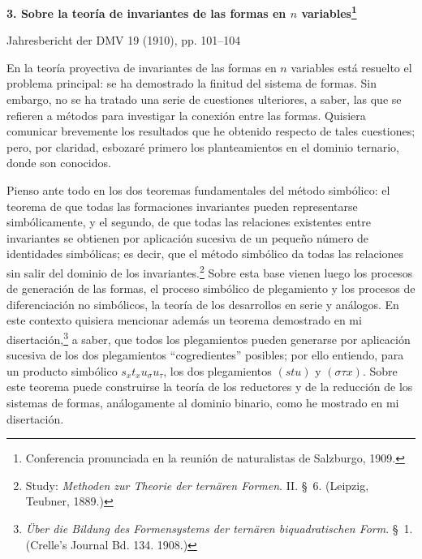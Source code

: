 \documentclass[11pt]{article}
\newcommand{\pair}[2]{(#1\,|\,#2)}
\newcommand{\eps}{\varepsilon}
\begin{document}
\clearpage

\providecommand{\pair}[2]{(#1\,|\,#2)}
\providecommand{\eps}{\varepsilon}
\providecommand{\rhoidx}{\varrho}

\begin{center}
{\Large\bfseries 3. Sobre la teoría de invariantes de las formas en $n$ variables\footnote{Conferencia pronunciada en la reunión de naturalistas de Salzburgo, 1909.}}\par
\vspace{1.2em}
Jahresbericht der DMV 19 (1910), pp. 101--104
\end{center}

\vspace{1em}
En la teoría proyectiva de invariantes de las formas en $n$ variables está resuelto el problema principal: se ha demostrado la finitud del sistema de formas. Sin embargo, no se ha tratado una serie de cuestiones ulteriores, a saber, las que se refieren a métodos para investigar la conexión entre las formas. Quisiera comunicar brevemente los resultados que he obtenido respecto de tales cuestiones; pero, por claridad, esbozaré primero los planteamientos en el dominio ternario, donde son conocidos.

Pienso ante todo en los dos teoremas fundamentales del método simbólico: el teorema de que todas las formaciones invariantes pueden representarse simbólicamente, y el segundo, de que todas las relaciones existentes entre invariantes se obtienen por aplicación sucesiva de un pequeño número de identidades simbólicas; es decir, que el método simbólico da todas las relaciones sin salir del dominio de los invariantes.\footnote{Study: \emph{Methoden zur Theorie der ternären Formen}. II. \S\ 6. (Leipzig, Teubner, 1889.)} Sobre esta base vienen luego los procesos de generación de las formas, el proceso simbólico de plegamiento y los procesos de diferenciación no simbólicos, la teoría de los desarrollos en serie y análogos. En este contexto quisiera mencionar además un teorema demostrado en mi disertación,\footnote{\emph{Über die Bildung des Formensystems der ternären biquadratischen Form}. \S\ 1. (Crelle's Journal Bd. 134. 1908.)} a saber, que todos los plegamientos pueden generarse por aplicación sucesiva de los dos plegamientos ``cogredientes'' posibles; por ello entiendo, para un producto simbólico $s_x t_x u_\sigma u_\tau$, los dos plegamientos $(stu)$ y $(\sigma\tau x)$. Sobre este teorema puede construirse la teoría de los reductores y de la reducción de los sistemas de formas, análogamente al dominio binario, como he mostrado en mi disertación.
\end{document}
